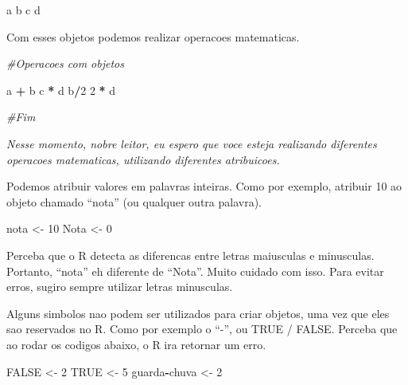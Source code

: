 \documentclass[
]{book}
\newenvironment{Shaded}{\begin{snugshade}}{\end{snugshade}}
\newcommand{\CommentTok}[1]{\textcolor[rgb]{0.56,0.35,0.01}{\textit{#1}}}
\newcommand{\ConstantTok}[1]{\textcolor[rgb]{0.56,0.35,0.01}{#1}}
\newcommand{\DecValTok}[1]{\textcolor[rgb]{0.00,0.00,0.81}{#1}}
\newcommand{\NormalTok}[1]{#1}
\newcommand{\OtherTok}[1]{\textcolor[rgb]{0.56,0.35,0.01}{#1}}
\newcommand{\SpecialCharTok}[1]{\textcolor[rgb]{0.81,0.36,0.00}{\textbf{#1}}}
\begin{document}
\begin{Shaded}
\begin{Highlighting}[]
\NormalTok{a}
\NormalTok{b}
\NormalTok{c}
\NormalTok{d}
\end{Highlighting}
\end{Shaded}

Com esses objetos podemos realizar operacoes matematicas.

\begin{Shaded}
\begin{Highlighting}[]
\CommentTok{\#Operacoes com objetos}

\NormalTok{a }\SpecialCharTok{+}\NormalTok{ b}
\NormalTok{c }\SpecialCharTok{*}\NormalTok{ d}
\NormalTok{b}\SpecialCharTok{/}\DecValTok{2}
\DecValTok{2} \SpecialCharTok{*}\NormalTok{ d}

\CommentTok{\#Fim}
\end{Highlighting}
\end{Shaded}

\emph{Nesse momento, nobre leitor, eu espero que voce esteja realizando diferentes operacoes matematicas, utilizando diferentes atribuicoes.}

Podemos atribuir valores em palavras inteiras. Como por exemplo, atribuir 10 ao objeto chamado ``nota'' (ou qualquer outra palavra).

\begin{Shaded}
\begin{Highlighting}[]
\NormalTok{nota }\OtherTok{\textless{}{-}} \DecValTok{10}
\NormalTok{Nota }\OtherTok{\textless{}{-}} \DecValTok{0}
\end{Highlighting}
\end{Shaded}

Perceba que o R detecta as diferencas entre letras maiusculas e minusculas. Portanto, ``nota'' eh diferente de ``Nota''. Muito cuidado com isso. Para evitar erros, sugiro sempre utilizar letras minusculas.

Alguns simbolos nao podem ser utilizados para criar objetos, uma vez que eles sao reservados no R. Como por exemplo o ``-'', ou TRUE / FALSE. Perceba que ao rodar os codigos abaixo, o R ira retornar um erro.

\begin{Shaded}
\begin{Highlighting}[]
\ConstantTok{FALSE} \OtherTok{\textless{}{-}} \DecValTok{2}
\ConstantTok{TRUE} \OtherTok{\textless{}{-}} \DecValTok{5}
\NormalTok{guarda}\SpecialCharTok{{-}}\NormalTok{chuva }\OtherTok{\textless{}{-}} \DecValTok{2}
\end{Highlighting}
\end{Shaded}
\end{document}

